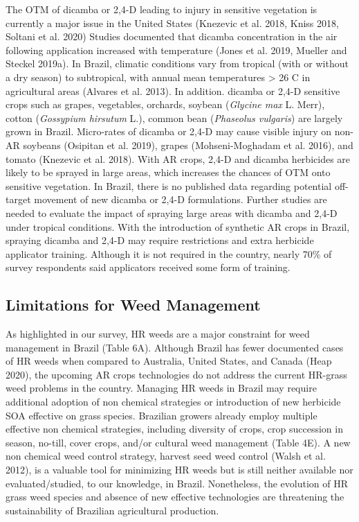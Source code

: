 \documentclass[
  12pt,
  a4paper]{article}
\begin{document}
The OTM of dicamba or 2,4-D leading to injury in sensitive vegetation is
currently a major issue in the United States (Knezevic et al. 2018,
Kniss 2018, Soltani et al. 2020) Studies documented that dicamba
concentration in the air following application increased with
temperature (Jones et al. 2019, Mueller and Steckel 2019a). In Brazil,
climatic conditions vary from tropical (with or without a dry season) to
subtropical, with annual mean temperatures \textgreater{} 26 C in
agricultural areas (Alvares et al. 2013). In addition. dicamba or 2,4-D
sensitive crops such as grapes, vegetables, orchards, soybean
(\emph{Glycine max} L. Merr), cotton (\emph{Gossypium hirsutum} L.),
common bean (\emph{Phaseolus vulgaris}) are largely grown in Brazil.
Micro-rates of dicamba or 2,4-D may cause visible injury on non-AR
soybeans (Osipitan et al. 2019), grapes (Mohseni-Moghadam et al. 2016),
and tomato (Knezevic et al. 2018). With AR crops, 2,4-D and dicamba
herbicides are likely to be sprayed in large areas, which increases the
chances of OTM onto sensitive vegetation. In Brazil, there is no
published data regarding potential off-target movement of new dicamba or
2,4-D formulations. Further studies are needed to evaluate the impact of
spraying large areas with dicamba and 2,4-D under tropical conditions.
With the introduction of synthetic AR crops in Brazil, spraying dicamba
and 2,4-D may require restrictions and extra herbicide applicator
training. Although it is not required in the country, nearly 70\% of
survey respondents said applicators received some form of training.

\hypertarget{limitations-for-weed-management}{%
\subsection{Limitations for Weed
Management}\label{limitations-for-weed-management}}

As highlighted in our survey, HR weeds are a major constraint for weed
management in Brazil (Table 6A). Although Brazil has fewer documented
cases of HR weeds when compared to Australia, United States, and Canada
(Heap 2020), the upcoming AR crops technologies do not address the
current HR-grass weed problems in the country. Managing HR weeds in
Brazil may require additional adoption of non chemical strategies or
introduction of new herbicide SOA effective on grass species. Brazilian
growers already employ multiple effective non chemical strategies,
including diversity of crops, crop succession in season, no-till, cover
crops, and/or cultural weed management (Table 4E). A new non chemical
weed control strategy, harvest seed weed control (Walsh et al. 2012), is
a valuable tool for minimizing HR weeds but is still neither available
nor evaluated/studied, to our knowledge, in Brazil. Nonetheless, the
evolution of HR grass weed species and absence of new effective
technologies are threatening the sustainability of Brazilian
agricultural production.
\end{document}
